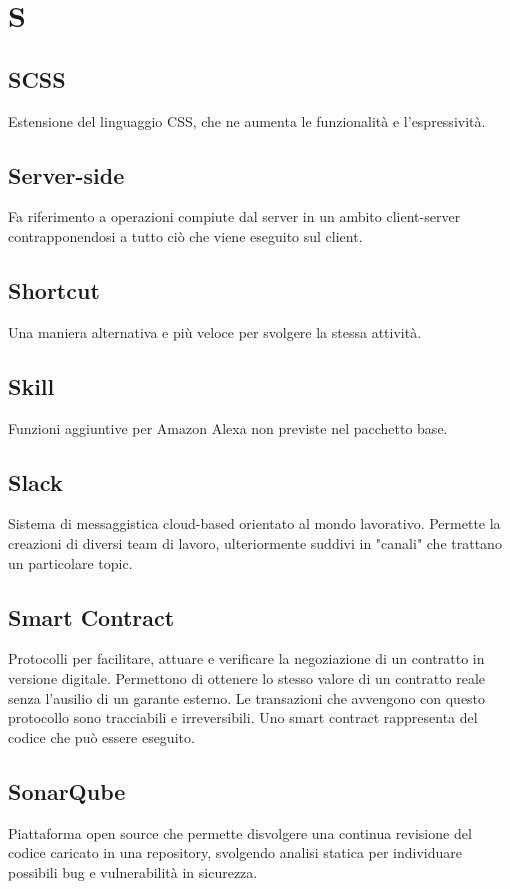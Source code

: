 \section*{S}
\subsection*{SCSS}
Estensione del linguaggio CSS, che ne aumenta le funzionalità e l'espressività.

\subsection*{Server-side}
Fa riferimento a operazioni compiute dal server in un ambito client-server contrapponendosi a tutto ciò che viene eseguito sul client.

\subsection*{Shortcut}
Una maniera alternativa e più veloce per svolgere la stessa attività.

\subsection*{Skill}
Funzioni aggiuntive per Amazon Alexa non previste nel pacchetto base.

\subsection*{Slack}
Sistema di messaggistica cloud-based orientato al mondo lavorativo. Permette la creazioni di diversi team di lavoro, ulteriormente suddivi in "canali" che trattano un particolare topic.

\subsection*{Smart Contract}
Protocolli per facilitare, attuare e verificare la negoziazione di un contratto in versione digitale. Permettono di ottenere lo stesso valore di un contratto reale senza l'ausilio di un garante esterno. Le transazioni che avvengono con questo protocollo sono tracciabili e irreversibili. Uno smart contract rappresenta del codice che può essere eseguito.

\subsection*{SonarQube}
Piattaforma open source che permette disvolgere una continua revisione del codice caricato in una repository, svolgendo analisi statica per individuare possibili bug e vulnerabilità in sicurezza.

